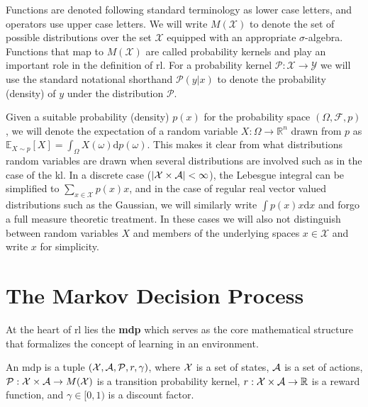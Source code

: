 Functions are denoted following standard terminology as lower case letters, and operators use upper case letters.
We will write $M(\mathcal{X})$ to denote the set of possible distributions over the set $\mathcal{X}$ equipped with an appropriate $\sigma$-algebra.
Functions that map to $M(\mathcal{X})$ are called probability kernels and play an important role in the definition of \ac{rl}.
For a probability kernel $\mathcal{P}: \mathcal{X} \rightarrow \mathcal{Y}$ we will use the standard notational shorthand $\mathcal{P}(y|x)$ to denote the probability (density) of $y$ under the distribution $\mathcal{P}$.

Given a suitable probability (density) $p(x)$ for the probability space $(\Omega,\mathcal{F},p)$, we will denote the expectation of a random variable $X: \Omega \rightarrow \mathbb{R}^n$ drawn from $p$ as $\mathbb{E}_{X \sim p}\left[X\right] = \int_{\Omega} X(\omega) \mathrm{d} p(\omega)$.
This makes it clear from what distributions random variables are drawn when several distributions are involved such as in the case of the \ac{kl}.
In a discrete case ($|\mathcal{X} \times \mathcal{A}| < \infty$), the Lebesgue integral can be simplified to $\sum_{x \in \mathcal{X}} p(x) x$, and in the case of regular real vector valued distributions such as the Gaussian, we will similarly write $\int p(x) x \mathrm{d} x$ and forgo a full measure theoretic treatment.
In these cases we will also not distinguish between random variables $X$ and members of the underlying spaces $x \in \mathcal{X}$ and write $x$ for simplicity.


\section{The Markov Decision Process}
\label{chap:background:mdp}


At the heart of \ac{rl} lies the \textbf{\ac{mdp}} which serves as the core mathematical structure that formalizes the concept of learning in an environment.


\begin{definition}
An {\ac{mdp}} is a tuple $(\mathcal{X},\mathcal{A},\mathcal{P},r,\gamma)$, where $\mathcal{X}$ is a set of states, $\mathcal{A}$ is a set of actions, $\mathcal{P}: \mathcal{X} \times \mathcal{A} \rightarrow M(\mathcal{X})$ is a transition probability kernel, $r: \mathcal{X} \times \mathcal{A} \rightarrow \mathbb{R}$ is a reward function, and $\gamma \in [0,1)$ is a discount factor.
\end{definition}

